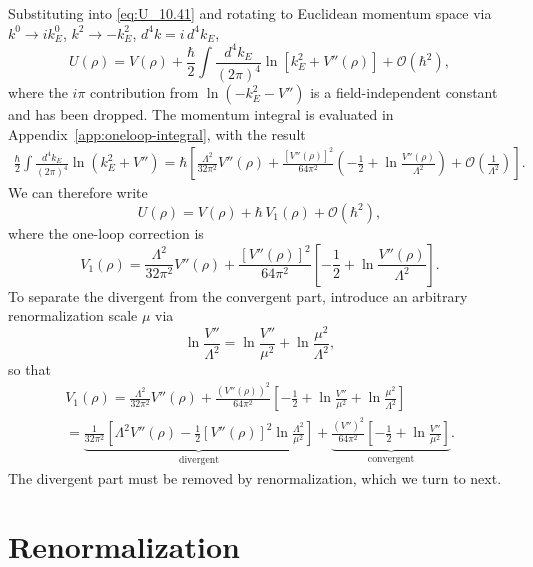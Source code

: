 Substituting into \eqref{eq:U_10.41} and rotating to Euclidean momentum
space via $k^0\to ik^0_E$, $k^2\to -k_E^2$, $d^4k = i\,d^4k_E$,
\begin{equation}
	U(\rho) = V(\rho)
	+ \frac{\hbar}{2}\int\frac{d^4k_E}{(2\pi)^4}
	\ln\left[k_E^2 + V''(\rho)\right]
	+ \mathcal{O}(\hbar^2),
	\label{eq:U_euclidean}
\end{equation}
where the $i\pi$ contribution from $\ln(-k_E^2-V'')$ is a field-independent
constant and has been dropped. The momentum integral is evaluated in
Appendix~\ref{app:oneloop-integral}, with the result
\begin{multline}
	\frac{\hbar}{2}\int\frac{d^4k_E}{(2\pi)^4}\ln(k_E^2+V'')
	= \hbar\left[\frac{\Lambda^2}{32\pi^2}V''(\rho)
		+ \frac{[V''(\rho)]^2}{64\pi^2}
		\left(-\frac{1}{2}+\ln\frac{V''(\rho)}{\Lambda^2}\right)
		+ \mathcal{O}\!\left(\frac{1}{\Lambda^2}\right)\right].
\end{multline}
We can therefore write
\begin{equation}
	U(\rho) = V(\rho) + \hbar\,V_1(\rho) + \mathcal{O}(\hbar^2),
\end{equation}
where the one-loop correction is
\begin{equation}
	V_1(\rho) = \frac{\Lambda^2}{32\pi^2}V''(\rho)
	+ \frac{[V''(\rho)]^2}{64\pi^2}
	\left[-\frac{1}{2}+\ln\frac{V''(\rho)}{\Lambda^2}\right].
	\label{eq:V1}
\end{equation}
To separate the divergent from the convergent part, introduce an arbitrary
renormalization scale $\mu$ via
\begin{equation}
	\ln\frac{V''}{\Lambda^2}
	= \ln\frac{V''}{\mu^2} + \ln\frac{\mu^2}{\Lambda^2},
\end{equation}
so that
\begin{multline}
	V_1(\rho)
	= \frac{\Lambda^2}{32\pi^2}V''(\rho)
	+ \frac{(V''(\rho))^2}{64\pi^2}
	\left[-\frac{1}{2}+\ln\frac{V''}{\mu^2}+\ln\frac{\mu^2}{\Lambda^2}
		\right] \\
	= \underbrace{\frac{1}{32\pi^2}\left[\Lambda^2 V''(\rho)
			- \frac{1}{2}[V''(\rho)]^2\ln\frac{\Lambda^2}{\mu^2}
			\right]}_{\text{divergent}}
	+ \underbrace{\frac{(V'')^2}{64\pi^2}
		\left[-\frac{1}{2}+\ln\frac{V''}{\mu^2}\right]}_{\text{convergent}}.
\end{multline}
The divergent part must be removed by renormalization, which we turn to
next.


\section{Renormalization}

